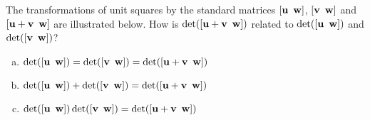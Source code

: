 \begin{applicationActivities}
\begin{activity}{5}
The transformations of unit squares by the
standard matrices \([\vec{u}\hspace{0.5em} \vec{w}]\), \([\vec{v}\hspace{0.5em} \vec{w}]\) and
\([\vec{u}+\vec{v}\hspace{0.5em} \vec{w}]\) are illustrated below.
How is $\det([\vec{u}+\vec{v}\hspace{0.5em} \vec{w}])$ related to
$\det([\vec{u}\hspace{0.5em} \vec{w}])$ and $\det([\vec{v}\hspace{0.5em} \vec{w}])$?
\begin{center}
\end{center}
  \begin{enumerate}[a)]
    \item
    $\det([\vec{u}\hspace{0.5em} \vec{w}])=\det([\vec{v}\hspace{0.5em} \vec{w}])=\det([\vec{u}+\vec{v}\hspace{0.5em} \vec{w}])$
    \item
    $\det([\vec{u}\hspace{0.5em} \vec{w}])+\det([\vec{v}\hspace{0.5em} \vec{w}])=\det([\vec{u}+\vec{v}\hspace{0.5em} \vec{w}])$
    \item
    $\det([\vec{u}\hspace{0.5em} \vec{w}])\det([\vec{v}\hspace{0.5em} \vec{w}])=\det([\vec{u}+\vec{v}\hspace{0.5em} \vec{w}])$
  \end{enumerate}
\end{activity}



\end{applicationActivities}
